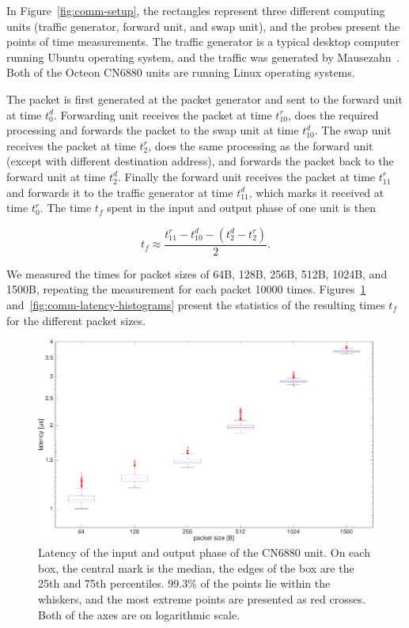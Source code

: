 In Figure~\ref{fig:comm-setup}, the rectangles represent three different computing units (traffic generator, forward unit, and swap unit), and the probes present the points of time measurements. The traffic generator is a typical desktop computer running Ubuntu operating system, and the traffic was generated by Mausezahn~\cite{mausezahn}. Both of the Octeon CN6880 units are running Linux operating systems.

The packet is first generated at the packet generator and sent to the forward unit at time $t^{d}_{0}$. Forwarding unit receives the packet at time $t^{r}_{10}$, does the required processing and forwards the packet to the swap unit at time $t^{d}_{10}$. The swap unit receives the packet at time $t^{r}_{2}$, does the same processing as the forward unit (except with different destination address), and forwards the packet back to the forward unit at time $t^{d}_{2}$. Finally the forward unit receives the packet at time $t^{r}_{11}$ and forwards it to the traffic generator at time $t^{d}_{11}$, which marks it received at time $t^{r}_{0}$. The time $t_{f}$ spent in the input and output phase of one unit is then

\begin{equation}
  \label{eq:1}
  t_{f} \approx \frac{t^{r}_{11} - t^{d}_{10} - (t^{d}_{2} - t^{r}_{2})}{2}.
\end{equation}

We measured the times for packet sizes of 64B, 128B, 256B, 512B, 1024B, and 1500B, repeating the measurement for each packet 10000 times. Figures~\ref{fig:comm-latency-boxplot} and~\ref{fig:comm-latency-histograms} present the statistics of the resulting times $t_{f}$ for the different packet sizes.

\begin{figure}[]
  \begin{center}
    \includegraphics[width=\textwidth]{images/comm-latency-boxplot.pdf}
    \caption{Latency of the input and output phase of the CN6880 unit. On each box, the central mark is the median, the edges of the box are the 25th and 75th percentiles. 99.3\% of the points lie within the whiskers, and the most extreme points are presented as red crosses. Both of the axes are on logarithmic scale.}
    \label{fig:comm-latency-boxplot}
  \end{center}
\end{figure}

